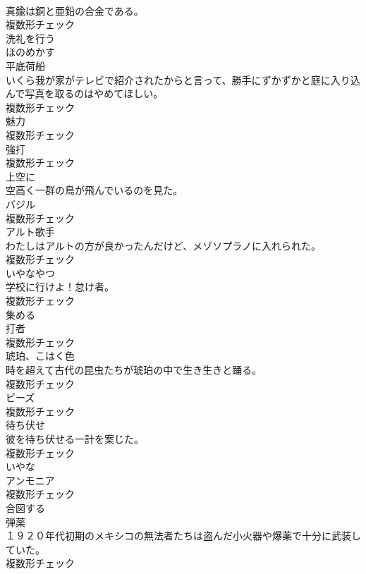 \documentclass[8pt]{extreport}
\begin{document}
\begin{CJK}{UTF8}{min}
\\	真鍮は銅と亜鉛の合金である。	
\\	複数形チェック
\\	[動詞]	洗礼を行う	
\\	[動詞]	ほのめかす	
\\	[名詞]	平底荷船	
\\	いくら我が家がテレビで紹介されたからと言って、勝手にずかずかと庭に入り込んで写真を取るのはやめてほしい。	
\\	複数形チェック
\\	[名詞]	魅力	
\\	複数形チェック
\\	[名詞]	強打	
\\	複数形チェック
\\	[副詞]	上空に	
\\	空高く一群の鳥が飛んでいるのを見た。	
\\	[名詞]	バジル	
\\	複数形チェック
\\	[名詞]	アルト歌手	
\\	わたしはアルトの方が良かったんだけど、メゾソプラノに入れられた。	
\\	複数形チェック
\\	[名詞]	いやなやつ	
\\	学校に行けよ！怠け者。	
\\	複数形チェック
\\	[動詞]	集める	
\\	[名詞]	打者	
\\	複数形チェック
\\	[名詞]	琥珀、こはく色	
\\	時を超えて古代の昆虫たちが琥珀の中で生き生きと踊る。	
\\	複数形チェック
\\	[名詞]	ビーズ	
\\	複数形チェック
\\	[名詞]	待ち伏せ	
\\	彼を待ち伏せる一計を案じた。	
\\	複数形チェック
\\	[形容詞]	いやな	
\\	[名詞]	アンモニア	
\\	複数形チェック
\\	[動詞]	合図する	
\\	[名詞]	弾薬	
\\	１９２０年代初期のメキシコの無法者たちは盗んだ小火器や爆薬で十分に武装していた。	
\\	複数形チェック

\end{CJK}
\end{document}
